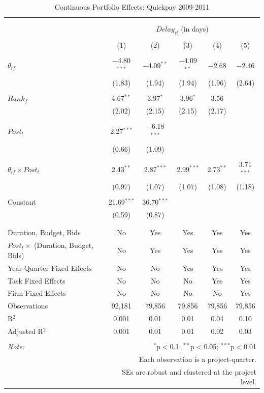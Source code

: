 \documentclass[]{article}
\begin{document}
\begin{table}[H] \centering 
  \caption{Continuous Portfolio Effects: Quickpay 2009-2011} 
  \label{} 
\small 
\begin{tabular}{@{\extracolsep{-2pt}}lccccc} 
\\[-1.8ex]\hline 
\hline \\[-1.8ex] 
\\[-1.8ex] & \multicolumn{5}{c}{$Delay_{it}$ (in days)} \\ 
\\[-1.8ex] & (1) & (2) & (3) & (4) & (5)\\ 
\hline \\[-1.8ex] 
 $\theta_{if}$ & $-$4.80$^{***}$ & $-$4.09$^{**}$ & $-$4.09$^{**}$ & $-$2.68 & $-$2.46 \\ 
  & (1.83) & (1.94) & (1.94) & (1.96) & (2.64) \\ 
  & & & & & \\ 
 $Rank_f$ & 4.67$^{**}$ & 3.97$^{*}$ & 3.96$^{*}$ & 3.56 &  \\ 
  & (2.02) & (2.15) & (2.15) & (2.17) &  \\ 
  & & & & & \\ 
 $Post_t$ & 2.27$^{***}$ & $-$6.18$^{***}$ &  &  &  \\ 
  & (0.66) & (1.09) &  &  &  \\ 
  & & & & & \\ 
 $\theta_{if} \times Post_t$ & 2.43$^{**}$ & 2.87$^{***}$ & 2.99$^{***}$ & 2.73$^{**}$ & 3.71$^{***}$ \\ 
  & (0.97) & (1.07) & (1.07) & (1.08) & (1.18) \\ 
  & & & & & \\ 
 Constant & 21.69$^{***}$ & 36.70$^{***}$ &  &  &  \\ 
  & (0.59) & (0.87) &  &  &  \\ 
  & & & & & \\ 
\hline \\[-1.8ex] 
Duration, Budget, Bids & No & Yes & Yes & Yes & Yes \\ 
$Post_t \times$  (Duration, Budget, Bids) & No & Yes & Yes & Yes & Yes \\ 
Year-Quarter Fixed Effects & No & No & Yes & Yes & Yes \\ 
Task Fixed Effects & No & No & No & Yes & Yes \\ 
Firm Fixed Effects & No & No & No & No & Yes \\ 
Observations & 92,181 & 79,856 & 79,856 & 79,856 & 79,856 \\ 
R$^{2}$ & 0.001 & 0.01 & 0.01 & 0.04 & 0.10 \\ 
Adjusted R$^{2}$ & 0.001 & 0.01 & 0.01 & 0.02 & 0.03 \\ 
\hline 
\hline \\[-1.8ex] 
\textit{Note:}  & \multicolumn{5}{r}{$^{*}$p$<$0.1; $^{**}$p$<$0.05; $^{***}$p$<$0.01} \\ 
 & \multicolumn{5}{r}{Each observation is a project-quarter.} \\ 
 & \multicolumn{5}{r}{SEs are robust and clustered at the project level.} \\ 
\end{tabular} 
\end{table}
\end{document}
